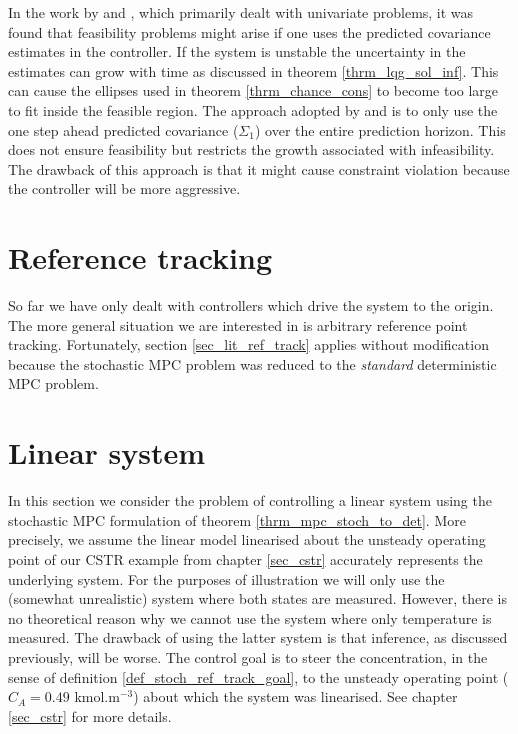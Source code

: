 In the work by \cite{yan1} and \cite{yan2}, which primarily dealt with univariate problems, it was found that feasibility problems might arise if one uses the predicted covariance estimates in the controller. If the system is unstable the uncertainty in the estimates can grow with time as discussed in theorem \ref{thrm_lqg_sol_inf}. This can cause the ellipses used in theorem \ref{thrm_chance_cons} to become too large to fit inside the feasible region. The approach adopted by \cite{yan1} and \cite{yan2} is to only use the one step ahead predicted covariance ($\Sigma_1$) over the entire prediction horizon. This does not ensure feasibility but restricts the growth associated with infeasibility. The drawback of this approach is that it might cause constraint violation because the controller will be more aggressive.  

\section{Reference tracking}
So far we have only dealt with controllers which drive the system to the origin. The more general situation we are interested in is arbitrary reference point tracking. Fortunately, section \ref{sec_lit_ref_track} applies without modification because the stochastic MPC problem was reduced to the \textit{standard} deterministic MPC problem. 

\section{Linear system}
\label{sec_lin_sys_cont}
In this section we consider the problem of controlling a linear system using the stochastic MPC formulation of theorem \ref{thrm_mpc_stoch_to_det}. More precisely, we assume the linear model linearised about the unsteady operating point of our CSTR example from chapter \ref{sec_cstr} accurately represents the underlying system. For the purposes of illustration we will only use the (somewhat unrealistic) system where both states are measured. However, there is no theoretical reason why we cannot use the system where only temperature is measured. The drawback of using the latter system is that inference, as discussed previously, will be worse. The control goal is to steer the concentration, in the sense of definition \ref{def_stoch_ref_track_goal}, to the unsteady operating point ($C_A = 0.49$ kmol.m$^{-3}$) about which the system was linearised. See chapter \ref{sec_cstr} for more details.

